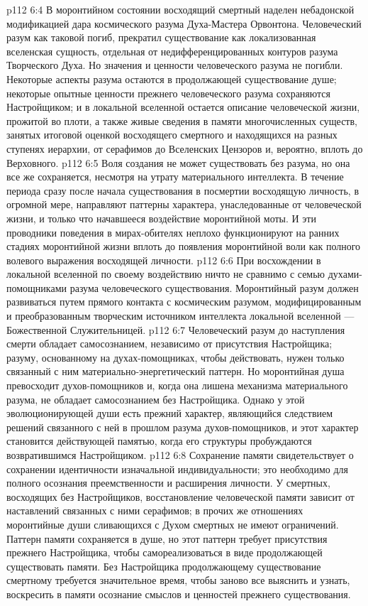 \vs p112 6:4 \pc В моронтийном состоянии восходящий смертный наделен небадонской модификацией дара космического разума Духа\hyp{}Мастера Орвонтона. Человеческий разум как таковой погиб, прекратил существование как локализованная вселенская сущность, отдельная от недифференцированных контуров разума Творческого Духа. Но значения и ценности человеческого разума не погибли. Некоторые аспекты разума остаются в продолжающей существование душе; некоторые опытные ценности прежнего человеческого разума сохраняются Настройщиком; и в локальной вселенной остается описание человеческой жизни, прожитой во плоти, а также живые сведения в памяти многочисленных существ, занятых итоговой оценкой восходящего смертного и находящихся на разных ступенях иерархии, от серафимов до Вселенских Цензоров и, вероятно, вплоть до Верховного.
\vs p112 6:5 Воля создания не может существовать без разума, но она все же сохраняется, несмотря на утрату материального интеллекта. В течение периода сразу после начала существования в посмертии восходящую личность, в огромной мере, направляют паттерны характера, унаследованные от человеческой жизни, и только что начавшееся воздействие моронтийной моты. И эти проводники поведения в мирах\hyp{}обителях неплохо функционируют на ранних стадиях моронтийной жизни вплоть до появления моронтийной воли как полного волевого выражения восходящей личности.
\vs p112 6:6 При восхождении в локальной вселенной по своему воздействию ничто не сравнимо с семью духами\hyp{}помощниками разума человеческого существования. Моронтийный разум должен развиваться путем прямого контакта с космическим разумом, модифицированным и преобразованным творческим источником интеллекта локальной вселенной --- Божественной Служительницей.
\vs p112 6:7 \pc Человеческий разум до наступления смерти обладает самосознанием, независимо от присутствия Настройщика; разуму, основанному на духах\hyp{}помощниках, чтобы действовать, нужен только связанный с ним материально\hyp{}энергетический паттерн. Но моронтийная душа превосходит духов\hyp{}помощников и, когда она лишена механизма материального разума, не обладает самосознанием без Настройщика. Однако у этой эволюционирующей души есть прежний характер, являющийся следствием решений связанного с ней в прошлом разума духов\hyp{}помощников, и этот характер становится действующей памятью, когда его структуры пробуждаются возвратившимся Настройщиком.
\vs p112 6:8 Сохранение памяти свидетельствует о сохранении идентичности изначальной индивидуальности; это необходимо для полного осознания преемственности и расширения личности. У смертных, восходящих без Настройщиков, восстановление человеческой памяти зависит от наставлений связанных с ними серафимов; в прочих же отношениях моронтийные души сливающихся с Духом смертных не имеют ограничений. Паттерн памяти сохраняется в душе, но этот паттерн требует присутствия прежнего Настройщика, чтобы  самореализоваться в виде продолжающей существовать памяти. Без Настройщика продолжающему существование смертному требуется значительное время, чтобы заново все выяснить и узнать, воскресить в памяти осознание смыслов и ценностей прежнего существования.
